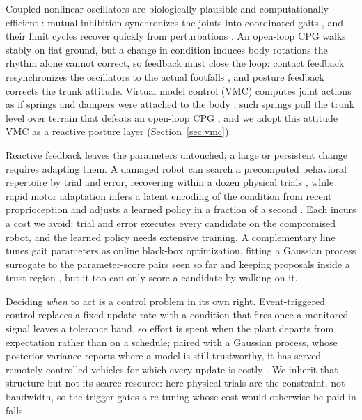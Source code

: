 \documentclass[letterpaper, 10 pt, conference]{ieeeconf}  %
\begin{document}
Coupled nonlinear oscillators are biologically plausible and computationally efficient \cite{collins1994hard, ijspeert2008special}: mutual inhibition synchronizes the joints into coordinated gaits \cite{collins1994hard, sprowitz2008passive, righetti2008pattern}, and their limit cycles recover quickly from perturbations \cite{sprowitz2008passive}.
An open-loop CPG walks stably on flat ground, but a change in condition induces body rotations the rhythm alone cannot correct, so feedback must close the loop: contact feedback resynchronizes the oscillators to the actual footfalls \cite{righetti2008pattern}, and posture feedback corrects the trunk attitude.
Virtual model control (VMC) computes joint actions as if springs and dampers were attached to the body \cite{pratt2001virtual}; such springs pull the trunk level over terrain that defeats an open-loop CPG \cite{ajallooeian2013central}, and we adopt this attitude VMC as a reactive posture layer (Section~\ref{sec:vmc}).

Reactive feedback leaves the parameters untouched; a large or persistent change requires adapting them.
A damaged robot can search a precomputed behavioral repertoire by trial and error, recovering within a dozen physical trials \cite{cully2015robots}, while rapid motor adaptation infers a latent encoding of the condition from recent proprioception and adjusts a learned policy in a fraction of a second \cite{kumar2021rma}.
Each incurs a cost we avoid: trial and error executes every candidate on the compromised robot, and the learned policy needs extensive training.
A complementary line tunes gait parameters as online black-box optimization, fitting a Gaussian process surrogate to the parameter-score pairs seen so far and keeping proposals inside a trust region \cite{eriksson2019scalable}, but it too can only score a candidate by walking on it.

Deciding \emph{when} to act is a control problem in its own right.
Event-triggered control replaces a fixed update rate with a condition that fires once a monitored signal leaves a tolerance band, so effort is spent when the plant departs from expectation rather than on a schedule; paired with a Gaussian process, whose posterior variance reports where a model is still trustworthy, it has served remotely controlled vehicles for which every update is costly \cite{jang2025event}.
We inherit that structure but not its scarce resource: here physical trials are the constraint, not bandwidth, so the trigger gates a re-tuning whose cost would otherwise be paid in falls.
\end{document}
